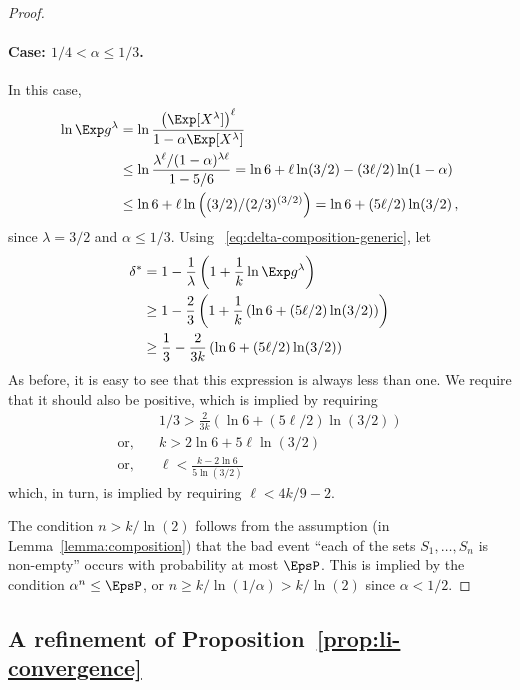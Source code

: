 \begin{proof}
\paragraph{Case: $1/4 < \alpha \leq 1/3$.}
In this case, 
\begin{align*}
    \ln \Exp g^\lambda 
    &= \ln \frac{\left(\Exp[X^\lambda] \right)^\ell}{1 - \alpha \Exp[X^\lambda]} \\
    &\leq \ln \frac{\lambda^\ell/(1 - \alpha)^{\lambda \ell}}{1 - 5/6}
    = \ln 6 + \ell \ln(3/2) - (3 \ell/2) \ln(1-\alpha) \\
    &\leq \ln 6 +  \ell \ln \left( (3/2)/(2/3)^{(3/2)} \right)
    = \ln 6 + (5\ell/2) \ln(3/2)
    \,,
\end{align*}
since $\lambda = 3/2$ and $\alpha \leq 1/3$.
Using ~\eqref{eq:delta-composition-generic}, let
\begin{align*}
    \delta^*
    &= 1 - \frac{1}{\lambda}\left(1 + \frac{1}{k} \ln \Exp g^\lambda \right) \\
    &\geq 1 - \frac{2}{3}\left(1 + \frac{1}{k} \left(\ln 6 + (5\ell/2) \ln(3/2) \right) \right) \\
    &\geq \frac{1}{3} - \frac{2}{3k} \left( \ln 6 + (5\ell/2)\ln(3/2) \right)
\end{align*}
As before, it is easy to see that this expression is always less than one. 
We require that it should also be positive, which is implied by requiring
\begin{align*}
    &1/3 >\frac{2}{3k} \left( \ln 6 + (5\ell/2)\ln(3/2) \right) \\
    \text{or,}\quad& k > 2\ln 6 + 5\ell\ln(3/2) \\
    \text{or,}\quad& \ell < \frac{k - 2\ln 6}{ 5\ln(3/2)}\,
\end{align*}
which, in turn, is implied by requiring $\ell < 4k/9 - 2$.

The condition $n > k/\ln(2)$ follows from the assumption (in Lemma~\ref{lemma:composition}) that 
the bad event ``each of the sets $S_1, \ldots, S_{n}$ is non-empty''
occurs with probability at most $\EpsP$. 
This is implied by the condition $\alpha^n \leq \EpsP$, or $n \geq k/\ln(1/\alpha) > k/\ln(2)$ since $\alpha < 1/2$. 
\end{proof}



\subsection{A refinement of Proposition~\ref{prop:li-convergence}}

